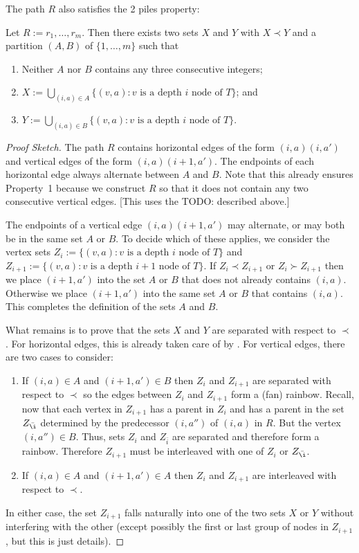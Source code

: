 \documentclass[kpfonts]{patmorin}
\begin{document}
The path $R$ also satisfies the 2 piles property:

\begin{lem}
  Let $R:=r_1,\ldots,r_m$.  Then there exists two sets $X$ and $Y$ with $X\prec Y$ and a partition $(A,B)$ of $\{1,\ldots,m\}$ such that
  \begin{enumerate}
     \item Neither $A$ nor $B$ contains any three consecutive integers;
     \item $X:=\bigcup_{(i,a)\in A}\{(v,a):\text{$v$ is a depth $i$ node of $T$}\}$; and
     \item $Y:=\bigcup_{(i,a)\in B}\{(v,a):\text{$v$ is a depth $i$ node of $T$}\}$.
 \end{enumerate}
\end{lem}

\begin{proof}[Proof Sketch]
    The path $R$ contains horizontal edges of the form $(i,a)(i,a')$ and vertical edges of the form $(i,a)(i+1,a')$.  The endpoints of each horizontal edge always alternate between $A$ and $B$. Note that this already ensures Property~1 because we construct $R$ so that it does not contain any two consecutive vertical edges. [This uses the TODO: described above.]

    The endpoints of a vertical edge $(i,a)(i+1,a')$ may alternate, or may both be in the same set $A$ or $B$.  To decide which of these applies, we consider the vertex sets $Z_i:=\{(v,a):\text{$v$ is a depth $i$ node of $T$}\}$ and $Z_{i+1}:=\{(v,a):\text{$v$ is a depth $i+1$ node of $T$}\}$.  If $Z_i\prec Z_{i+1}$ or $Z_i\succ Z_{i+1}$ then we place $(i+1,a')$ into the set $A$ or $B$ that does not already contains $(i,a)$.  Otherwise we place $(i+1,a')$ into the same set $A$ or $B$  that contains $(i,a)$.  This completes the definition of the sets $A$ and $B$.

    What remains is to prove that the sets $X$ and $Y$ are separated with respect to $\prec$.  For horizontal edges, this is already taken care of by .  For vertical edges, there are two cases to consider:
    \begin{enumerate}
        \item If $(i,a)\in A$ and $(i+1,a')\in B$ then $Z_i$ and $Z_{i+1}$ are separated with respect to $\prec$ so the edges between $Z_i$ and $Z_{i+1}$ form a (fan) rainbow. Recall, now that each vertex in $Z_{i+1}$ has a parent in $Z_i$ and has a parent in the set $Z_{\bar\i}$ determined by the predecessor $(i,a'')$ of $(i,a)$ in $R$.  But the vertex $(i,a'')\in B$.  Thus, sets $Z_i$ and $Z_{\bar i}$ are separated and therefore form a rainbow.  Therefore $Z_{i+1}$ must be interleaved with one of $Z_i$ or $Z_{\bar\i}$.

        \item If $(i,a)\in A$ and $(i+1,a')\in A$ then $Z_i$ and $Z_{i+1}$ are interleaved with respect to $\prec$.
    \end{enumerate}
    In either case, the set $Z_{i+1}$ falls naturally into one of the two sets $X$ or $Y$ without interfering with the other (except possibly the first or last group of nodes in $Z_{i+1}$, but this is just details).
\end{proof}
\end{document}
